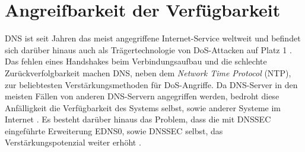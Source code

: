 \section{Angreifbarkeit der Verfügbarkeit}
\label{sec:Thread-DosAmp}

DNS ist seit Jahren das meist angegriffene Internet-Service weltweit und befindet sich darüber hinaus auch als Trägertechnologie von DoS-Attacken auf Platz 1 \cite{Alcoy2017}. Das fehlen eines Handshakes beim Verbindungsaufbau und die schlechte Zurückverfolgbarkeit machen DNS, neben dem \textit{Network Time Protocol} (NTP), zur beliebtesten Verstärkungsmethoden für DoS-Angriffe. Da DNS-Server in den meisten Fällen von anderen DNS-Servern angegriffen werden, bedroht diese Anfälligkeit die Verfügbarkeit des Systems selbst, sowie anderer Systeme im Internet \cite{Kambourakis2008}. Es besteht darüber hinaus das Problem, dass die mit DNSSEC eingeführte Erweiterung EDNS0, sowie DNSSEC selbst, das Verstärkungspotenzial weiter erhöht \cite{Anagnostopoulos2013}\cite{VanRijswijk-Deij2014}.

